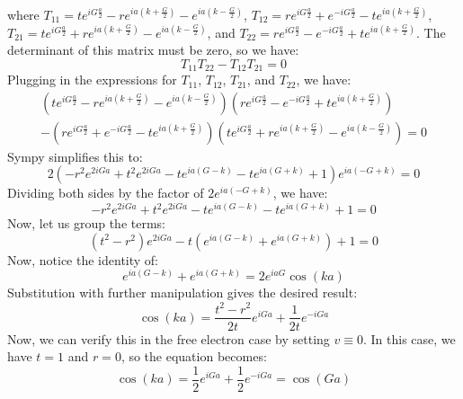 \documentclass[12pt]{article}
\begin{document}
where $T_{11} = t e^{iG\frac{a}{2}} - re^{ia\left(k+\frac{G}{2} \right)} - e^{ia\left(k-\frac{G}{2} \right)}$, $T_{12} = re^{iG\frac{a}{2}} + e^{-iG\frac{a}{2}} - te^{ia\left(k+\frac{G}{2} \right)}$, $T_{21} = t e^{iG\frac{a}{2}} + re^{ia\left(k+\frac{G}{2} \right)} - e^{ia\left(k-\frac{G}{2} \right)}$, and $T_{22} = re^{iG\frac{a}{2}} - e^{-iG\frac{a}{2}} + te^{ia\left(k+\frac{G}{2} \right)}$. The determinant of this matrix must be zero, so we have:
\begin{equation}
    T_{11}T_{22} - T_{12}T_{21} = 0
\end{equation}
Plugging in the expressions for $T_{11}$, $T_{12}$, $T_{21}$, and $T_{22}$, we have:
\begin{align}
    \left(t e^{iG\frac{a}{2}} - re^{ia\left(k+\frac{G}{2} \right)} - e^{ia\left(k-\frac{G}{2} \right)}\right) \left(re^{iG\frac{a}{2}} - e^{-iG\frac{a}{2}} + te^{ia\left(k+\frac{G}{2} \right)}\right)\\ - \left(re^{iG\frac{a}{2}} + e^{-iG\frac{a}{2}} - te^{ia\left(k+\frac{G}{2} \right)}\right) \left(t e^{iG\frac{a}{2}} + re^{ia\left(k+\frac{G}{2} \right)} - e^{ia\left(k-\frac{G}{2} \right)}\right) = 0
\end{align}
Sympy simplifies this to:
\begin{equation}
    2 \left(- r^{2} e^{2 i G a} + t^{2} e^{2 i G a} - t e^{i a \left(G - k\right)} - t e^{i a \left(G + k\right)} + 1\right) e^{i a \left(- G + k\right)} = 0
\end{equation}
Dividing both sides by the factor of $2e^{i a \left(- G + k\right)}$, we have:
\begin{equation}
    - r^{2} e^{2 i G a} + t^{2} e^{2 i G a} - t e^{i a \left(G - k\right)} - t e^{i a \left(G + k\right)} + 1 = 0
\end{equation}
Now, let us group the terms:
\begin{equation}
    \left(t^{2} - r^{2}\right) e^{2 i G a} - t \left(e^{i a \left(G - k\right)} + e^{i a \left(G + k\right)}\right) + 1 = 0
\end{equation}
Now, notice the identity of:
\begin{equation}
    e^{i a \left(G - k\right)} + e^{i a \left(G + k\right)} = 2e^{i a G} \cos(ka)
\end{equation}
Substitution with further manipulation gives the desired result:
\begin{equation}
    \cos(ka) = \frac{t^2 - r^2}{2t} e^{iGa} + \frac{1}{2t} e^{-iGa}
\end{equation}
Now, we can verify this in the free electron case by setting $v\equiv 0$. In this case, we have $t=1$ and $r=0$, so the equation becomes:
\begin{equation}
    \cos(ka) = \frac{1}{2} e^{iGa} + \frac{1}{2} e^{-iGa} = \cos(Ga)
\end{equation}
\end{document}
